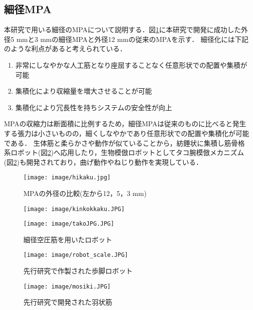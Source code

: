 \subsection{細径MPA}
本研究で用いる細径のMPAについて説明する．図\ref{fig:campare}に本研究で開発に成功した外径5 mmと3 mmの細径MPAと外径12 mmの従来のMPAを示す．
細径化には下記のような利点があると考えられている\cite{wakimoto}\cite{1390282680917523328}．
\begin{enumerate}
  \item 非常にしなやかな人工筋となり座屈することなく任意形状での配置や集積が可能
  \item 集積化により収縮量を増大させることが可能
  \item 集積化により冗長性を持ちシステムの安全性が向上
\end{enumerate}
MPAの収縮力は断面積に比例するため，細径MPAは従来のものに比べると発生する張力は小さいものの，細くしなやかであり任意形状での配置や集積化が可能である．
生体筋と柔らかさや動作が似ていることから，紡錘状に集積し筋骨格系ロボット(図\ref{fig:saikei})へ応用したり，生物模倣ロボットとしてタコ腕模倣メカニズム(図\ref{fig:saikei})も開発されており，曲げ動作やねじり動作を実現している\cite{森和也2014}．
\begin{figure}[t]
  \centering
  \texttt{[image: image/hikaku.jpg]}
  \caption{MPAの外径の比較(左から12，5，3 mm)}
  \label{fig:campare}
\end{figure}
%
\begin{figure}
  \begin{minipage}{0.5\columnwidth}
    \centering  
    \texttt{[image: image/kinkokkaku.JPG]}
    \label{fig:kin}
  \end{minipage}
  \begin{minipage}{0.5\columnwidth}
    \centering
    \vspace{5mm}
    \texttt{[image: image/takoJPG.JPG]}
    \label{fig:tako}
  \end{minipage}
  \caption{細径空圧筋を用いたロボット}
  \label{fig:saikei}
\end{figure}
\begin{figure}[t]
  \begin{minipage}{0.47\columnwidth}
    \centering
    \texttt{[image: image/robot\_scale.JPG]}
    \vspace{3mm}
    \caption{先行研究で作製された歩脚ロボット\cite{hasegawa}}
    \label{fig:senkoukenkyuu}
  \end{minipage}
  \begin{minipage}{0.47\columnwidth}
    \centering
    \vspace{3mm}
    \texttt{[image: image/mosiki.JPG]}
    \caption{先行研究で開発された羽状筋\cite{hasegawa}}
    \label{fig:ujyoukin}
  \end{minipage}
\end{figure}
